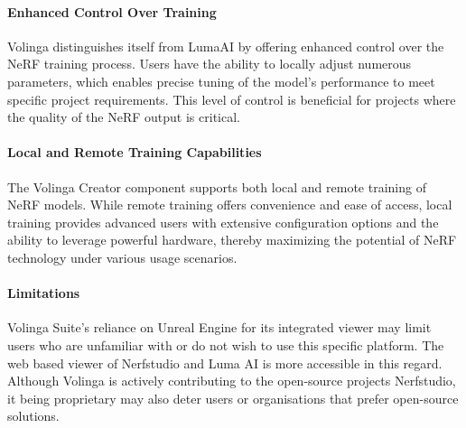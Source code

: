 \paragraph{Enhanced Control Over Training}
Volinga distinguishes itself from LumaAI by offering enhanced control over the NeRF training process.
Users have the ability to locally adjust numerous parameters, which enables precise tuning of the model's performance to meet specific project requirements.
This level of control is beneficial for projects where the quality of the NeRF output is critical.

\paragraph{Local and Remote Training Capabilities}
The Volinga Creator component supports both local and remote training of NeRF models.
While remote training offers convenience and ease of access, local training provides advanced users with extensive configuration options and the ability to leverage powerful hardware, thereby maximizing the potential of NeRF technology under various usage scenarios.

\paragraph{Limitations}
Volinga Suite's reliance on Unreal Engine for its integrated viewer may limit users who are unfamiliar with or do not wish to use this specific platform.
The web based viewer of Nerfstudio and Luma AI is more accessible in this regard.
Although Volinga is actively contributing to the open-source projects Nerfstudio, it being proprietary may also deter users or organisations that prefer open-source solutions.
